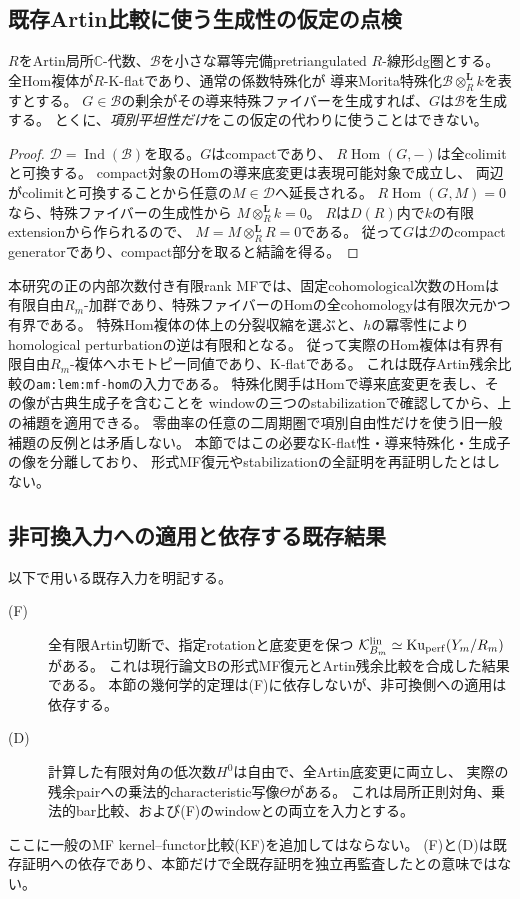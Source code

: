 \subsection{既存Artin比較に使う生成性の仮定の点検}

\begin{lemma}[導来特殊化とcompact生成子]\label{gr:lem:derived-generation}
$R$をArtin局所$\mathbb C$-代数、$\mathcal B$を小さな冪等完備pretriangulated
$R$-線形dg圏とする。全Hom複体が$R$-K-flatであり、通常の係数特殊化が
導来Morita特殊化$\mathcal B\otimes_R^{\mathbf L}k$を表すとする。
$G\in\mathcal B$の剰余がその導来特殊ファイバーを生成すれば、$G$は$\mathcal B$を生成する。
とくに、\emph{項別平坦性だけ}をこの仮定の代わりに使うことはできない。
\end{lemma}
\begin{proof}
$\mathcal D=\operatorname{Ind}(\mathcal B)$を取る。$G$はcompactであり、
$R\operatorname{Hom}(G,-)$は全colimitと可換する。
compact対象のHomの導来底変更は表現可能対象で成立し、
両辺がcolimitと可換することから任意の$M\in\mathcal D$へ延長される。
$R\operatorname{Hom}(G,M)=0$なら、特殊ファイバーの生成性から
$M\otimes_R^{\mathbf L}k=0$。
$R$は$D(R)$内で$k$の有限extensionから作られるので、
$M=M\otimes_R^{\mathbf L}R=0$である。
従って$G$は$\mathcal D$のcompact generatorであり、compact部分を取ると結論を得る。
\end{proof}

本研究の正の内部次数付き有限rank MFでは、固定cohomological次数のHomは
有限自由$R_m$-加群であり、特殊ファイバーのHomの全cohomologyは有限次元かつ有界である。
特殊Hom複体の体上の分裂収縮を選ぶと、$h$の冪零性により
homological perturbationの逆は有限和となる。
従って実際のHom複体は有界有限自由$R_m$-複体へホモトピー同値であり、K-flatである。
これは既存Artin残余比較の\texttt{am:lem:mf-hom}の入力である。
特殊化関手はHomで導来底変更を表し、その像が古典生成子を含むことを
windowの三つのstabilizationで確認してから、上の補題を適用できる。
零曲率の任意の二周期圏で項別自由性だけを使う旧一般補題の反例とは矛盾しない。
本節ではこの必要なK-flat性・導来特殊化・生成子の像を分離しており、
形式MF復元やstabilizationの全証明を再証明したとはしない。

\subsection{非可換入力への適用と依存する既存結果}

以下で用いる既存入力を明記する。
\begin{description}
\item[(F)] 全有限Artin切断で、指定rotationと底変更を保つ
$\mathcal K^{\rm lin}_{B_m}\simeq\operatorname{Ku}_{\rm perf}(Y_m/R_m)$がある。
これは現行論文Bの形式MF復元とArtin残余比較を合成した結果である。
本節の幾何学的定理は(F)に依存しないが、非可換側への適用は依存する。
\item[(D)] 計算した有限対角の低次数$H^0$は自由で、全Artin底変更に両立し、
実際の残余pairへの乗法的characteristic写像$\Theta$がある。
これは局所正則対角、乗法的bar比較、および(F)のwindowとの両立を入力とする。
\end{description}
ここに一般のMF kernel--functor比較(KF)を追加してはならない。
(F)と(D)は既存証明への依存であり、本節だけで全既存証明を独立再監査したとの意味ではない。

